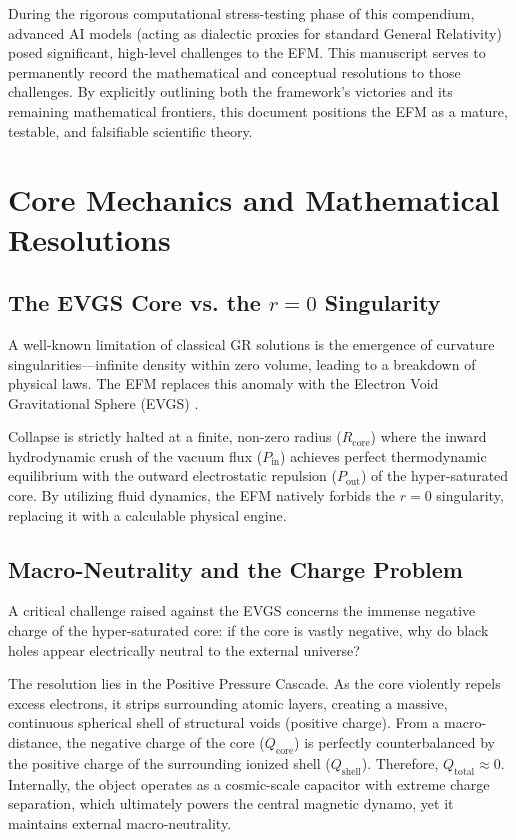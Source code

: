 \documentclass[11pt, a4paper]{article}
\begin{document}
During the rigorous computational stress-testing phase of this compendium, advanced AI models (acting as dialectic proxies for standard General Relativity) posed significant, high-level challenges to the EFM. This manuscript serves to permanently record the mathematical and conceptual resolutions to those challenges. By explicitly outlining both the framework's victories and its remaining mathematical frontiers, this document positions the EFM as a mature, testable, and falsifiable scientific theory.

\section{Core Mechanics and Mathematical Resolutions}

\subsection{The EVGS Core vs. the \texorpdfstring{$r=0$}{r=0} Singularity}
A well-known limitation of classical GR solutions is the emergence of curvature singularities---infinite density within zero volume, leading to a breakdown of physical laws. The EFM replaces this anomaly with the Electron Void Gravitational Sphere (EVGS) \cite{marabut2026m4}.

Collapse is strictly halted at a finite, non-zero radius ($R_{\text{core}}$) where the inward hydrodynamic crush of the vacuum flux ($P_{\text{in}}$) achieves perfect thermodynamic equilibrium with the outward electrostatic repulsion ($P_{\text{out}}$) of the hyper-saturated core. By utilizing fluid dynamics, the EFM natively forbids the $r=0$ singularity, replacing it with a calculable physical engine.

\subsection{Macro-Neutrality and the Charge Problem}
A critical challenge raised against the EVGS concerns the immense negative charge of the hyper-saturated core: if the core is vastly negative, why do black holes appear electrically neutral to the external universe? 

The resolution lies in the Positive Pressure Cascade. As the core violently repels excess electrons, it strips surrounding atomic layers, creating a massive, continuous spherical shell of structural voids (positive charge). From a macro-distance, the negative charge of the core ($Q_{\text{core}}$) is perfectly counterbalanced by the positive charge of the surrounding ionized shell ($Q_{\text{shell}}$). Therefore, $Q_{\text{total}} \approx 0$. Internally, the object operates as a cosmic-scale capacitor with extreme charge separation, which ultimately powers the central magnetic dynamo, yet it maintains external macro-neutrality.
\end{document}
